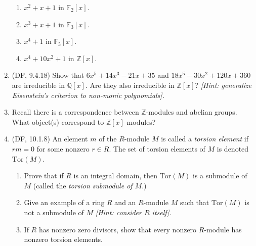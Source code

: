 \documentclass{amsart}
\theoremstyle{definition}
\newcommand{\Zz}{\mathbb{Z}}
\newcommand{\Qq}{\mathbb{Q}}
\newcommand{\Ff}{\mathbb{F}}
\newcommand{\Tor}{\text{Tor}}
\begin{document}
\begin{enumerate}
  \begin{enumerate}
  \item $x^2 + x + 1$ in $\Ff_2[x]$.
  \item $x^3 + x + 1$ in $\Ff_3[x]$.
  \item $x^4 + 1$ in $\Ff_5[x]$.
  \item $x^4 + 10x^2 + 1$ in $\Zz[x]$.

  \end{enumerate}
\item (DF, 9.4.18) Show that $6x^5 + 14x^3 -21x + 35$ and $18x^5 - 30x^2 +120 x + 360$ are irreducible in $\Qq[x]$. Are they also irreducible in $\Zz[x]$? \emph{[Hint: generalize Eisenstein's criterion to non-monic polynomials].}
\item Recall there is a correspondence between $\Zz$-modules and abelian groups. What object(s) correspond to $\Zz[x]$-modules?  
\item (DF, 10.1.8) An element $m$ of the $R$-module $M$ is called a \emph{torsion element} if $rm = 0$ for some nonzero $r \in R$. The set of torsion elements of $M$ is denoted $\Tor (M)$.
  \begin{enumerate}
  \item Prove that if $R$ is an integral domain, then $\Tor (M)$ is a submodule of $M$ (called the \emph{torsion submodule of $M$}.)
  \item Give an example of a ring $R$ and an $R$-module $M$ such that $\Tor (M)$ is not a submodule of $M$ \emph{[Hint: consider $R$ itself]}.
  \item If $R$ has nonzero zero divisors, show that every nonzero $R$-module has nonzero torsion elements.
  \end{enumerate}
\end{enumerate}
\end{document}
